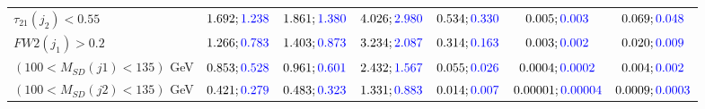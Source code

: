 \begin{landscape}
\begin{table}
\begin{tabular}{lcccccc}
				\rowcolor{black!7}$\tau_{21}(j_2)<0.55$ &$1.692;\textcolor{blue}{1.238}$ &$1.861;\textcolor{blue}{1.380}$ &$4.026;\textcolor{blue}{2.980}$&$0.534;\textcolor{blue}{0.330}$&$0.005;\textcolor{blue}{0.003}$&$0.069;\textcolor{blue}{0.048}$\\
				$FW2(j_1)>0.2$ &$1.266;\textcolor{blue}{0.783}$ &$1.403;\textcolor{blue}{0.873}$&$3.234;\textcolor{blue}{2.087}$&$0.314;\textcolor{blue}{0.163}$&$0.003;\textcolor{blue}{0.002}$&$0.020;\textcolor{blue}{0.009}$\\
				\rowcolor{black!7}$(100<M_{SD}(j1)<135)$ GeV& $0.853;\textcolor{blue}{0.528}$&$0.961;\textcolor{blue}{0.601}$&$2.432;\textcolor{blue}{1.567}$&$0.055;\textcolor{blue}{0.026}$&$0.0004;\textcolor{blue}{0.0002}$&$0.004;\textcolor{blue}{0.002}$\\
				$(100<M_{SD}(j2)<135)$ GeV &$0.421;\textcolor{blue}{0.279}$ &$0.483;\textcolor{blue}{0.323}$ &$1.331;\textcolor{blue}{0.883}$&$0.014;\textcolor{blue}{0.007}$&$0.00001;\textcolor{blue}{0.00004}$&$0.0009;\textcolor{blue}{0.0003}$\\
				\bottomrule
			\end{tabular}
		\end{table}


\end{landscape}
